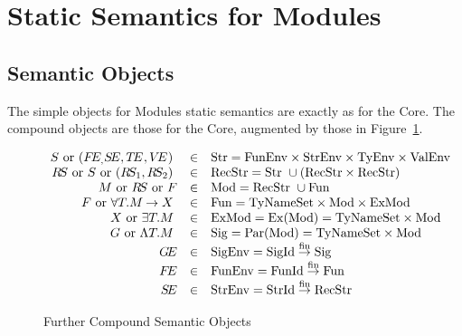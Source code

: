 \section{Static Semantics for Modules}
\label{statmod-sec}
\subsection{Semantic Objects}
\label{statmod-sem-obj-sec}
The simple 
objects for Modules static semantics are exactly as for the Core.
The compound objects are those for the Core,
augmented by those in Figure~\ref{module-objects}.


\begin{figure}[h]
\begin{displaymath}
\begin{array}{rcl}
\S\ {\rm or}\ \longstr\   & \in & \Str = \FunEnv\times\StrEnv\times\TyEnv\times\ValEnv \\
\RS\ {\rm or}\ \S\ {\rm or}\ \longrecstr{1}{2}\ 
                & \in & \RecStr = \Str\ \cup (\RecStr\times\RecStr) \\
\M\ {\rm or}\ \RS\ {\rm or}\ \F 
                & \in & \Mod = \RecStr\ \cup \Fun \\
\F\ {\rm or}\ \longfun\  & \in & \Fun = \TyNameSets \times \Mod \times \ExMod \\
\XM\ {\rm or}\ \longexmod\  & \in & \ExMod = \EXISTENTIAL{\Mod} = \TyNameSets \times \Mod \\
\G\ {\rm or}\ \longsig\  & \in & \Sig = \PARAMETERISED{\Mod} = \TyNameSets \times \Mod \\
\GE		& \in	& \SigEnv = \finfun{\SigId}{\Sig} \\
\FE		& \in	& \FunEnv = \finfun{\FunId}{\Fun}  \\
\SE		& \in	& \StrEnv = \finfun{\StrId}{\RecStr} 
\end{array}
\end{displaymath}
\caption{Further Compound Semantic Objects}
\label{module-objects}
\end{figure}

